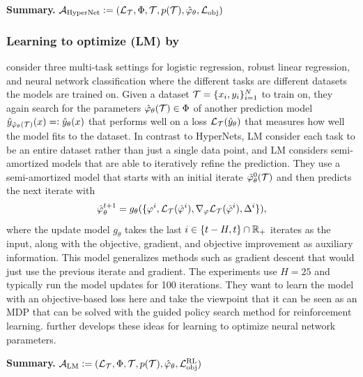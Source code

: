 \documentclass[twoside,11pt]{article}
\begin{document}
\textbf{Summary.}
${\mathcal{A}}_{\rm HyperNet}\vcentcolon=({\mathcal{L}}_{\mathcal{T}}, \Phi, {\mathcal{T}}, p({\mathcal{T}}), \hat \varphi_\theta, {\mathcal{L}}_{\rm obj})$

\subsubsection{Learning to optimize (LM) by \citet{li2016learning}}
\citet{li2016learning} consider three multi-task settings for
logistic regression, robust linear regression, and neural network classification
where the different tasks are different datasets the models are
trained on.
Given a dataset ${\mathcal{T}}=\{x_i,y_i\}_{i=1}^N$ to train on,
they again search for the parameters
$\hat \varphi_\theta({\mathcal{T}})\in\Phi$
of another prediction model $\hat y_{\hat \varphi_\theta({\mathcal{T}})}(x)=\vcentcolon \hat y_\theta(x)$
that performs well on a loss
${\mathcal{L}}_{\mathcal{T}}(\hat y_\theta)$
that measures how well the model fits to the dataset.
In contrast to HyperNets, LM consider each task to be an
entire dataset rather than just a single data point,
and LM considers semi-amortized models that are able
to iteratively refine the prediction.
They use a semi-amortized model that starts with
an initial iterate $\hat \varphi^0_\theta({\mathcal{T}})$ and then
predicts the next iterate with
\begin{equation}
  \hat \varphi^{t+1}_\theta = g_\theta(\{\varphi^i, {\mathcal{L}}_{\mathcal{T}}(\hat \varphi^i),
  \nabla_\varphi {\mathcal{L}}_{\mathcal{T}}(\hat \varphi^i), \Delta^i\}),
  \label{eq:LM-model}
\end{equation}
where the update model $g_\theta$ takes the
last $i\in\{t-H,t\}\cap \mathbb{R}_+$ iterates as the input,
along with the objective, gradient, and objective improvement
as auxiliary information.
This model generalizes methods such as gradient descent
that would just use the previous iterate and gradient.
The experiments use $H=25$ and typically run
the model updates for 100 iterations.
They want to learn the model with an objective-based
loss here and take the viewpoint that it can be seen as
an MDP that can be solved with the guided policy search
\citep{levine2013guided} method for reinforcement learning.
\citet{li2017learning} further develops these ideas for
learning to optimize neural network parameters.

\textbf{Summary.}
${\mathcal{A}}_{\rm LM}\vcentcolon=({\mathcal{L}}_{\mathcal{T}}, \Phi, {\mathcal{T}}, p({\mathcal{T}}), \hat \varphi_\theta, {\mathcal{L}}_{\rm obj}^{\rm RL})$
\end{document}
